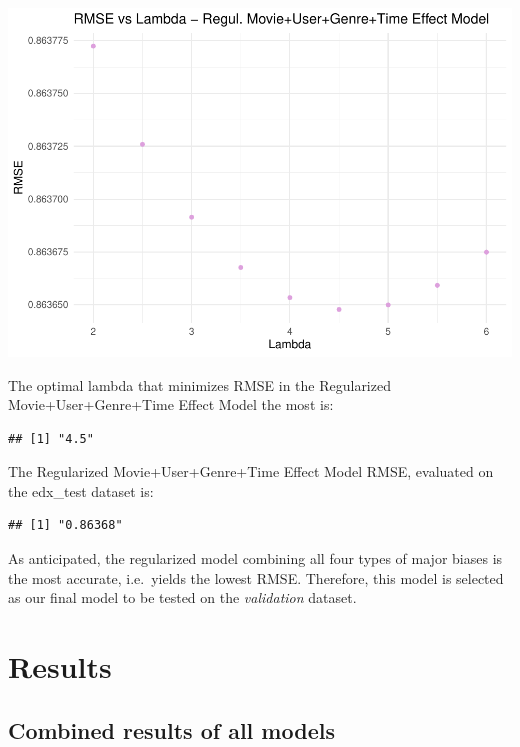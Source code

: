 \documentclass[
]{article}
\begin{document}
\begin{center}\includegraphics{MovieLens-Report_MitjaPrah_files/figure-latex/unnamed-chunk-51-1} \end{center}

The optimal lambda that minimizes RMSE in the Regularized
Movie+User+Genre+Time Effect Model the most is:

\begin{verbatim}
## [1] "4.5"
\end{verbatim}

The Regularized Movie+User+Genre+Time Effect Model RMSE, evaluated on
the edx\_test dataset is:

\begin{verbatim}
## [1] "0.86368"
\end{verbatim}

As anticipated, the regularized model combining all four types of major
biases is the most accurate, i.e.~yields the lowest RMSE. Therefore,
this model is selected as our final model to be tested on the
\emph{validation} dataset.

\newpage

\hypertarget{results}{%
\section{Results}\label{results}}

\hypertarget{combined-results-of-all-models}{%
\subsection{Combined results of all
models}\label{combined-results-of-all-models}}
\end{document}
